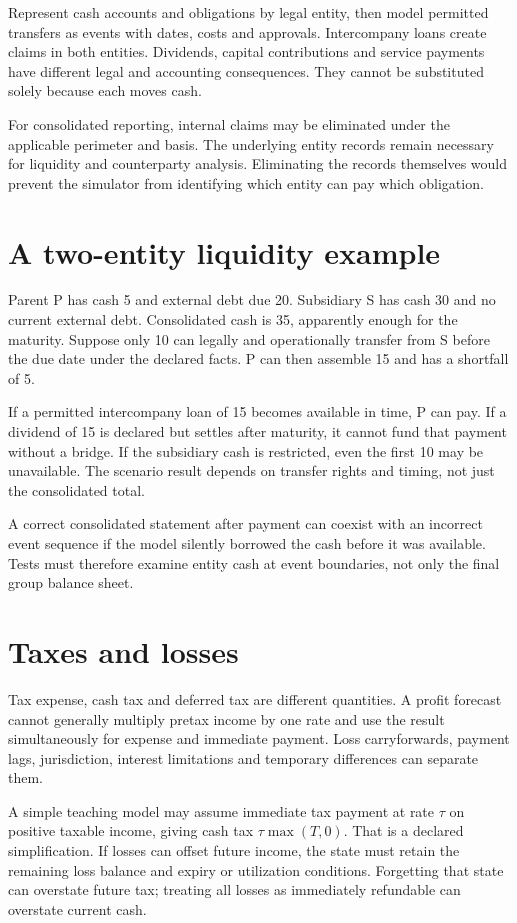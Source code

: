 Represent cash accounts and obligations by legal entity, then model permitted transfers as events with dates, costs and approvals. Intercompany loans create claims in both entities. Dividends, capital contributions and service payments have different legal and accounting consequences. They cannot be substituted solely because each moves cash.

For consolidated reporting, internal claims may be eliminated under the applicable perimeter and basis. The underlying entity records remain necessary for liquidity and counterparty analysis. Eliminating the records themselves would prevent the simulator from identifying which entity can pay which obligation.

\section{A two-entity liquidity example}
Parent P has cash 5 and external debt due 20. Subsidiary S has cash 30 and no current external debt. Consolidated cash is 35, apparently enough for the maturity. Suppose only 10 can legally and operationally transfer from S before the due date under the declared facts. P can then assemble 15 and has a shortfall of 5.

If a permitted intercompany loan of 15 becomes available in time, P can pay. If a dividend of 15 is declared but settles after maturity, it cannot fund that payment without a bridge. If the subsidiary cash is restricted, even the first 10 may be unavailable. The scenario result depends on transfer rights and timing, not just the consolidated total.

A correct consolidated statement after payment can coexist with an incorrect event sequence if the model silently borrowed the cash before it was available. Tests must therefore examine entity cash at event boundaries, not only the final group balance sheet.

\section{Taxes and losses}
Tax expense, cash tax and deferred tax are different quantities. A profit forecast cannot generally multiply pretax income by one rate and use the result simultaneously for expense and immediate payment. Loss carryforwards, payment lags, jurisdiction, interest limitations and temporary differences can separate them.

A simple teaching model may assume immediate tax payment at rate $\tau$ on positive taxable income, giving cash tax $\tau\max(T,0)$. That is a declared simplification. If losses can offset future income, the state must retain the remaining loss balance and expiry or utilization conditions. Forgetting that state can overstate future tax; treating all losses as immediately refundable can overstate current cash.

